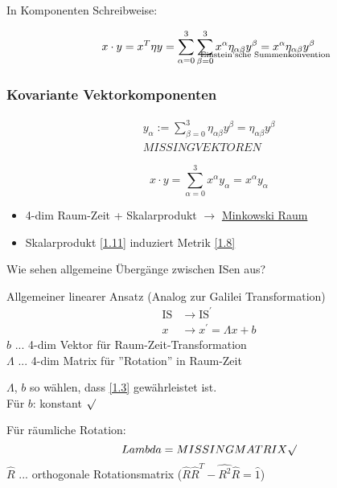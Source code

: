 \documentclass[a4paper, 11pt]{article}
\numberwithin{equation}{section}
\begin{document}
In Komponenten Schreibweise:

\begin{equation}
x \cdot y  = x^T \eta y = \sum^3_{\alpha = 0} \sum^3_{\beta = 0} x^\alpha \eta_{\alpha \beta} y^\beta \underset{\mathclap{\text{Einstein'sche  Summenkonvention}}}{=} x^\alpha \eta_{\alpha \beta} y^\beta
\end{equation}

\subsubsection*{Kovariante Vektorkomponenten}

\begin{equation}
\begin{aligned}
y_\alpha := \sum^3_{\beta=0} \eta_{\alpha \beta} y^\beta = \eta_{\alpha \beta} y^\beta\\
MISSING VEKTOREN
\end{aligned}
\end{equation}

\begin{equation}
x \cdot y = \sum^3_{\alpha = 0} x^\alpha y_\alpha = x^\alpha y_\alpha
\end{equation}

\begin{itemize}
\item 4-dim Raum-Zeit + Skalarprodukt $\rightarrow$ \underline{Minkowski Raum}
\item Skalarprodukt \ref{1.11} induziert Metrik \ref{1.8}
\end{itemize}


Wie sehen allgemeine Übergänge zwischen ISen aus?

Allgemeiner linearer Ansatz (Analog zur Galilei Transformation)
\begin{equation}
\begin{aligned}
\text{IS} &\rightarrow \text{IS}^\prime\\
x &\rightarrow x^\prime = \Lambda x + b
\end{aligned}
\end{equation}
$b$ ... 4-dim Vektor für Raum-Zeit-Transformation\\
$\Lambda$ ... 4-dim Matrix für ''Rotation'' in Raum-Zeit

$\Lambda$, $b$ so wählen, dass \ref{1.3} gewährleistet ist.\\
Für $b$: konstant $\surd$ 

Für räumliche Rotation:
\begin{equation}
Lambda = MISSING MATRIX \surd
\end{equation}
$\hat{R}$ ... orthogonale Rotationsmatrix ($\hat{R}\hat{R}^T- \hat{R^2} \hat{R} = \hat{1}$)
\end{document}
